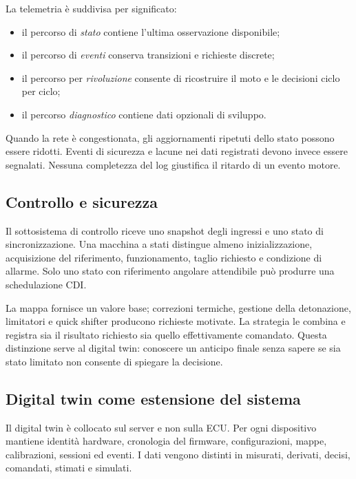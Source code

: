 \documentclass{article}
\begin{document}
La telemetria è suddivisa per significato:

\begin{itemize}
    \item il percorso di \emph{stato} contiene l'ultima osservazione disponibile;
    \item il percorso di \emph{eventi} conserva transizioni e richieste discrete;
    \item il percorso per \emph{rivoluzione} consente di ricostruire il moto e
          le decisioni ciclo per ciclo;
    \item il percorso \emph{diagnostico} contiene dati opzionali di sviluppo.
\end{itemize}

Quando la rete è congestionata, gli aggiornamenti ripetuti dello stato possono
essere ridotti. Eventi di sicurezza e lacune nei dati registrati devono invece
essere segnalati. Nessuna completezza del log giustifica il ritardo di un evento
motore.

\subsection{Controllo e sicurezza}

Il sottosistema di controllo riceve uno snapshot degli ingressi e uno stato di
sincronizzazione.
Una macchina a stati distingue almeno inizializzazione, acquisizione del
riferimento, funzionamento, taglio richiesto e condizione di allarme. Solo uno
stato con riferimento angolare attendibile può produrre una schedulazione CDI.

La mappa fornisce un valore base; correzioni termiche, gestione della
detonazione, limitatori e quick shifter producono richieste motivate. La
strategia le combina e registra sia il risultato richiesto sia quello
effettivamente comandato. Questa distinzione serve al digital twin: conoscere
un anticipo finale senza sapere se sia stato limitato non consente di spiegare
la decisione.

\subsection{Digital twin come estensione del sistema}

Il digital twin è collocato sul server e non sulla ECU. Per ogni dispositivo
mantiene identità hardware, cronologia del firmware, configurazioni, mappe,
calibrazioni, sessioni ed eventi. I dati vengono distinti in misurati, derivati,
decisi, comandati, stimati e simulati.
\end{document}
